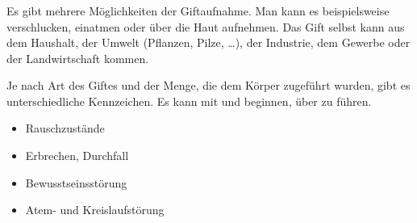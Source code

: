 

\subsubsection{}
\label{topic:vergiftungen-ehi}

{
Es gibt mehrere Möglichkeiten der Giftaufnahme. Man kann es
beispielsweise verschlucken, einatmen oder über die Haut
aufnehmen. Das Gift selbst kann aus dem Haushalt, der Umwelt
(Pflanzen, Pilze, \ldots), der Industrie, dem Gewerbe oder
der Landwirtschaft kommen.

}{
}{}{}{}

{
Je nach Art des Giftes und der Menge, die dem Körper zugeführt wurden, gibt es
unterschiedliche Kennzeichen. Es kann mit  und
 beginnen, über  zu
 führen.
}{
\begin{itemize}
    \item Rauschzustände
    \item Erbrechen, Durchfall
    \item Bewusstseinsstörung
    \item Atem- und Kreislaufstörung
\end{itemize}
}{}{}{}





\subsubsection{}


\clearpage %





% 


